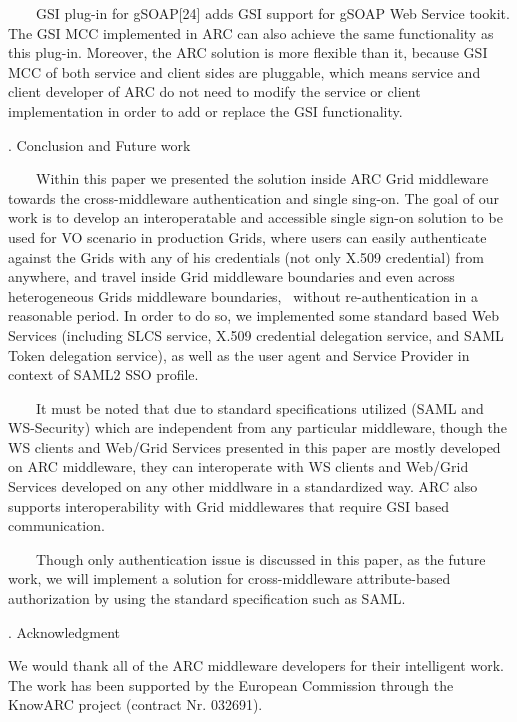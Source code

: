 \documentclass{article}
\begin{document}
\ \ \ \ GSI plug-in for gSOAP[24] adds GSI support for gSOAP Web Service
tookit. The GSI MCC implemented in ARC can also achieve the same
functionality as this plug-in. Moreover, the ARC solution is more
flexible than it, because GSI MCC of both service and client sides are
pluggable, which means service and client developer of ARC do not need
to modify the service or client implementation in order to add or
replace the GSI functionality.


\bigskip

{. Conclusion and Future work
\par}

\ \ \ \ Within this paper we presented the solution inside ARC Grid
middleware towards the cross-middleware authentication and single
sing-on. The goal of our work is to develop an interoperatable and
accessible single sign-on solution to be used for VO scenario in
production Grids, where users can easily authenticate against the Grids
with any of his credentials (not only X.509 credential) from anywhere,
and travel inside Grid middleware boundaries and even across
heterogeneous Grids middleware boundaries, \ without re-authentication
in a reasonable period. In order to do so, we implemented some standard
based Web Services (including SLCS service, X.509 credential delegation
service, and SAML Token delegation service), as well as the user agent
and Service Provider in context of SAML2 SSO profile.

\ \ \ \ It must be noted that due to standard specifications utilized
(SAML and WS-Security) which are independent from any particular
middleware, though the WS clients and Web/Grid Services presented in
this paper are mostly developed on ARC middleware, they can
interoperate with WS clients and Web/Grid Services developed on any
other middlware in a standardized way. ARC also supports
interoperability with Grid middlewares that require GSI based
communication.

\ \ \ \ Though only authentication issue is discussed in this paper, as
the future work, we will implement a solution for cross-middleware
attribute-based authorization by using the standard specification such
as SAML.

{. Acknowledgment
\par}

We would thank all of the ARC middleware developers for their
intelligent work. The work has been supported by the European
Commission through the KnowARC project (contract Nr. 032691). 
\end{document}
